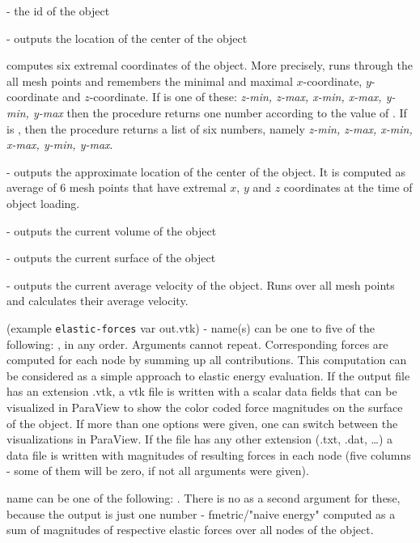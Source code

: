 \begin{arguments}
\item[\var{oid}] - the id of the object
\item[\opt{origin}] - outputs the location of the center of the object
\item[\opt{pos-bounds \var{bname}}] computes six extremal coordinates of the object. More precisely, runs through the all mesh points and remembers the minimal and maximal $x$-coordinate, $y$-coordinate and $z$-coordinate. If  is one of these: \textit{z-min, z-max, x-min, x-max, y-min, y-max} then the procedure returns one number according to the value of . If  is , then the procedure returns a list of six numbers, namely \textit{z-min, z-max, x-min, x-max, y-min, y-max}.
\item[\opt{approx-pos}] - outputs the approximate location of the center of the object. It is computed as average of 6 mesh points that have extremal $x$, $y$ and $z$ coordinates at the time of object loading.
\item[\opt{volume}] - outputs the current volume of the object
\item[\opt{surface-area}] - outputs the current surface of the object
\item[\opt{velocity}] - outputs the current average velocity of the object. Runs over all mesh points and calculates their average velocity.
\item[\opt{elastic-forces \var{name(s)} \var{output\_file.dat}}] (example \verb|elastic-forces|    var {out.vtk}) - name(s) can be one to five of the following: , in any order. Arguments cannot repeat. Corresponding forces are computed for each node by summing up all contributions.  This computation can be considered as a simple approach to elastic energy evaluation. If the output file has an extension .vtk, a vtk file is written with a scalar data fields that can be visualized in ParaView to show the color coded force magnitudes on the surface of the object. If more than one options were given, one can switch between the visualizations in ParaView. If the file has any other extension (.txt, .dat, \dots) a data file is written with magnitudes of resulting forces in each node (five columns - some of them will be zero, if not all arguments were given).
\item[\opt{f-metric \var{name}}] name can be one of the following: . There is no  as a second argument for these, because the output is just one number - fmetric/"naive energy" computed as a sum of magnitudes of respective elastic forces over all nodes of the object.

\end{arguments}
